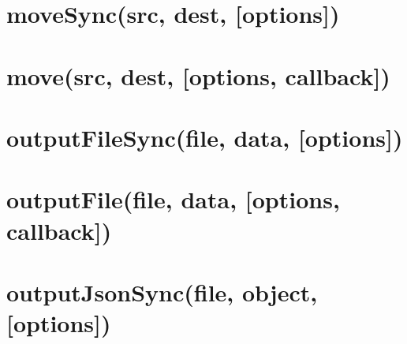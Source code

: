 \documentclass[twoside]{book}
\newcommand{\+}{\discretionary{\mbox{\scriptsize$\hookleftarrow$}}{}{}}
\begin{document}
\chapter{move\+Sync(src, dest, \mbox{[}options\mbox{]})}
\label{md_dsmacc_vis_degree_node_modules_electron-packager_node_modules_electron-download_node_modules_fs-extra_docs_move-sync}

\chapter{move(src, dest, \mbox{[}options, callback\mbox{]})}
\label{md_dsmacc_vis_degree_node_modules_electron-packager_node_modules_electron-download_node_modules_fs-extra_docs_move}

\chapter{output\+File\+Sync(file, data, \mbox{[}options\mbox{]})}
\label{md_dsmacc_vis_degree_node_modules_electron-packager_node_modules_electron-download_node_modules_fs-extra_docs_outputFile-sync}

\chapter{output\+File(file, data, \mbox{[}options, callback\mbox{]})}
\label{md_dsmacc_vis_degree_node_modules_electron-packager_node_modules_electron-download_node_modules_fs-extra_docs_outputFile}

\chapter{output\+Json\+Sync(file, object, \mbox{[}options\mbox{]})}
\label{md_dsmacc_vis_degree_node_modules_electron-packager_node_modules_electron-download_node_modules_fs-extra_docs_outputJson-sync}

\end{document}
